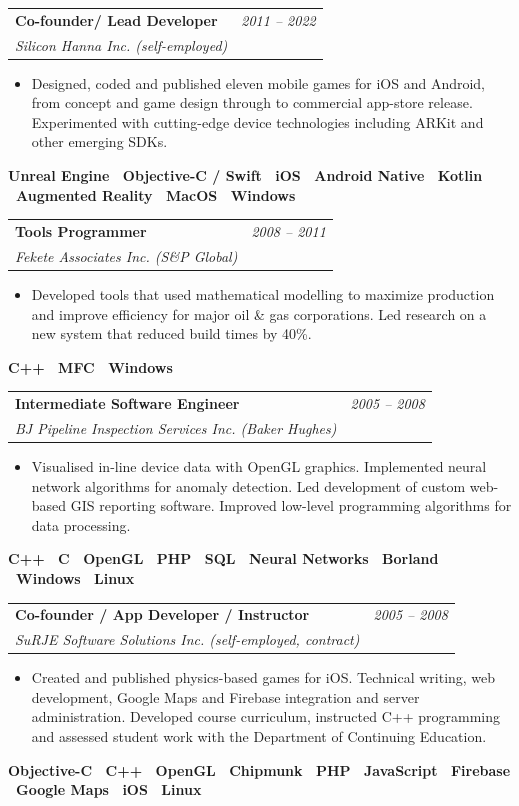 \documentclass[10pt]{article}
\makeatletter
\newcommand{\tech}[1]{\textcolor{secondary}{\textbf{#1}}}
\newcommand{\experience}[4]{%
  \vspace{4pt}
  \begin{tabular*}{\textwidth}{@{}l@{\extracolsep{\fill}}r@{}}
    \textbf{#1} & \textit{#2} \\
    \textit{\small#3} & \textit{\small#4}
  \end{tabular*}
  \vspace{-4pt}
}
\makeatother
\begin{document}
\experience{Co-founder/ Lead Developer}{2011 -- 2022}{Silicon Hanna Inc. (self-employed)}{}
\begin{itemize}
    \item Designed, coded and published eleven mobile games for iOS and Android, from concept and game design through to commercial app-store release. Experimented with cutting-edge device technologies including ARKit and other emerging SDKs.
\end{itemize}
\textbf{\tech{Unreal Engine} \textbullet\ \tech{Objective-C / Swift} \textbullet\ \tech{iOS} \textbullet\ \tech{Android Native} \textbullet\ \tech{Kotlin} \textbullet\ \tech{Augmented Reality} \textbullet\ \tech{MacOS} \textbullet\ \tech{Windows}}

\experience{Tools Programmer}{2008 -- 2011}{Fekete Associates Inc. (S\&P Global)}{}
\begin{itemize}
    \item Developed tools that used mathematical modelling to maximize production and improve efficiency for major oil \& gas corporations. Led research on a new system that reduced build times by 40\%.
\end{itemize}
\textbf{\tech{C++} \textbullet\ \tech{MFC} \textbullet\ \tech{Windows}}

\experience{Intermediate Software Engineer}{2005 -- 2008}{BJ Pipeline Inspection Services Inc. (Baker Hughes)}{}
\begin{itemize}
    \item Visualised in-line device data with OpenGL graphics. Implemented neural network algorithms for anomaly detection. Led development of custom web-based GIS reporting software. Improved low-level programming algorithms for data processing.
\end{itemize}
\textbf{\tech{C++} \textbullet\ \tech{C} \textbullet\ \tech{OpenGL} \textbullet\ \tech{PHP} \textbullet\ \tech{SQL} \textbullet\ \tech{Neural Networks} \textbullet\ \tech{Borland} \textbullet\ \tech{Windows} \textbullet\ \tech{Linux}}

\experience{Co-founder / App Developer / Instructor}{2005 -- 2008}{SuRJE Software Solutions Inc. (self-employed, contract)}{}
\begin{itemize}
    \item Created and published physics-based games for iOS. Technical writing, web development, Google Maps and Firebase integration and server administration. Developed course curriculum, instructed C++ programming and assessed student work with the Department of Continuing Education.
\end{itemize}
\textbf{\tech{Objective-C} \textbullet\ \tech{C++} \textbullet\ \tech{OpenGL} \textbullet\ \tech{Chipmunk} \textbullet\ \tech{PHP} \textbullet\ \tech{JavaScript} \textbullet\ \tech{Firebase} \textbullet\ \tech{Google Maps} \textbullet\ \tech{iOS} \textbullet\ \tech{Linux}}
\end{document}
